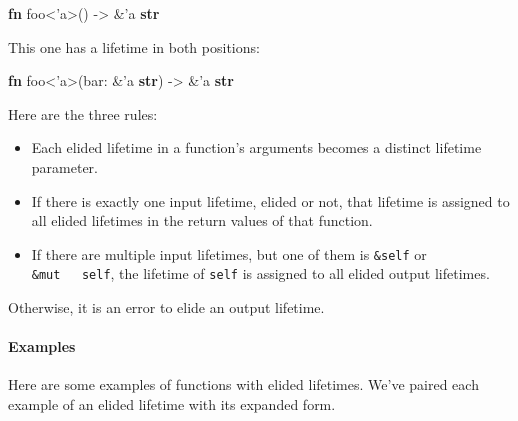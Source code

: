 \documentclass[a4paper,]{book}
\newenvironment{Shaded}{\begin{snugshade}}{\end{snugshade}}
\newcommand{\KeywordTok}[1]{\textcolor[rgb]{0.13,0.29,0.53}{\textbf{{#1}}}}
\newcommand{\OtherTok}[1]{\textcolor[rgb]{0.56,0.35,0.01}{{#1}}}
\newcommand{\NormalTok}[1]{{#1}}
\begin{document}
\begin{Shaded}
\begin{Highlighting}[]
\KeywordTok{fn} \NormalTok{foo<}\OtherTok{'a}\NormalTok{>() -> &}\OtherTok{'a} \KeywordTok{str}
\end{Highlighting}
\end{Shaded}

This one has a lifetime in both positions:

\begin{Shaded}
\begin{Highlighting}[]
\KeywordTok{fn} \NormalTok{foo<}\OtherTok{'a}\NormalTok{>(bar: &}\OtherTok{'a} \KeywordTok{str}\NormalTok{) -> &}\OtherTok{'a} \KeywordTok{str}
\end{Highlighting}
\end{Shaded}

Here are the three rules:

\begin{itemize}
\item
  Each elided lifetime in a function's arguments becomes a distinct
  lifetime parameter.
\item
  If there is exactly one input lifetime, elided or not, that lifetime
  is assigned to all elided lifetimes in the return values of that
  function.
\item
  If there are multiple input lifetimes, but one of them is
  \texttt{\&self} or \texttt{\&mut\ \ \ self}, the lifetime of
  \texttt{self} is assigned to all elided output lifetimes.
\end{itemize}

Otherwise, it is an error to elide an output lifetime.

\paragraph{Examples}\label{examples}

Here are some examples of functions with elided lifetimes. We've paired
each example of an elided lifetime with its expanded form.
\end{document}
